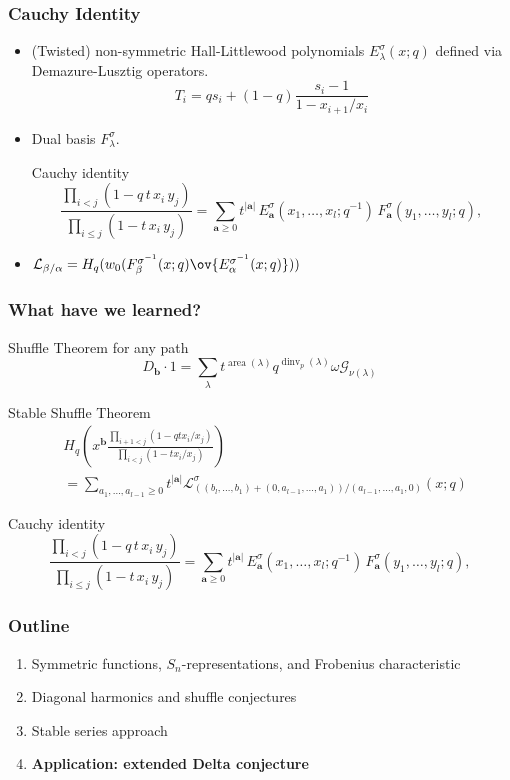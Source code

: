 \documentclass{beamer}
\DeclareMathOperator{\area}{area}
\DeclareMathOperator{\dinv}{dinv}
\newcommand{\Gcal}{\mathcal{G}}
\newcommand{\Lcal}{{\mathcal L}}
\newcommand{\bb}{{\mathbf b}}
\newcommand{\aA}{{\mathbf a}}
\begin{document}
\begin{frame}
  \frametitle{Cauchy Identity}
  \begin{itemize}
  \item (Twisted) non-symmetric Hall-Littlewood polynomials
    \(E_\lambda^\sigma(x;q)\) defined via Demazure-Lusztig
    operators. \[
      T_i = qs_i+(1-q)\frac{s_i-1}{1-x_{i+1}/x_i}
    \]\pause
  \item Dual basis \(F_\lambda^\sigma\).\pause
    \begin{block}{Cauchy identity}
      \[ \frac{\prod _{i<j} (1 - q\, t\, x_{i} \, y_{j})}{\prod
          _{i\leq j} (1 - t\, x_{i}\, y_{j})} = \sum _{\aA \geq 0}
        t^{|\aA |}\, E^{\sigma }_{\aA }(x_{1},\ldots,x_{l};q^{-1}) \,
        F^{\sigma }_{\aA }(y_{1},\ldots,y_{l};q),
      \]
    \end{block}\pause
  \item \(\Lcal_{\beta/\alpha} = H_q(
    w_0(F_\beta^{\sigma^{-1}}(x;q)
      \ov{E_\alpha^{\sigma^{-1}}(x;q)})) \)
  \end{itemize}
\end{frame}
\begin{frame}
  \frametitle{What have we learned?}
  \begin{block}{Shuffle Theorem for any path}
    \[
    D_\bb \cdot 1
    =
    \sum_{\lambda} t^{\area(\lambda)}
      q^{\dinv_p(\lambda)} \omega \Gcal_{\nu(\lambda)}
    \]    
  \end{block}\pause
  \begin{block}{Stable Shuffle Theorem}
    \vspace{-0.2in}
    \begin{align*}
    &H_q\left(x^{\bb} \frac{\prod_{i+1 < j} (1-qt x_i/x_j)}{\prod_{i<j} (1-t
    x_i/x_j)} \right)\\
    & =
    \sum_{a_1,\ldots,a_{l-1} \geq 0}
      t^{|\aA|}\Lcal^\sigma_{((b_l,\ldots,b_1)+(0,a_{l-1},\ldots,a_1))/(a_{l-1},\ldots,a_1,0)}(x;q) 
    \end{align*}
  \end{block}\pause
  \begin{block}{Cauchy identity}
    \[
 \frac{\prod _{i<j} (1 - q\, t\, x_{i} \, y_{j})}{\prod
    _{i\leq j} (1 - t\, x_{i}\, y_{j})} =
    \sum _{\aA \geq 0}
        t^{|\aA |}\, E^{\sigma }_{\aA }(x_{1},\ldots,x_{l};q^{-1}) \,
        F^{\sigma }_{\aA }(y_{1},\ldots,y_{l};q),
    \] 
  \end{block}
\end{frame}
\begin{frame}
  \frametitle{Outline}
  \begin{enumerate}
  \item Symmetric functions, \(S_n\)-representations, and Frobenius characteristic
  \item {Diagonal harmonics and shuffle conjectures}
  \item {Stable series approach}
  \item {\bf Application: extended Delta conjecture}
  \end{enumerate}
\end{frame}
\end{document}
